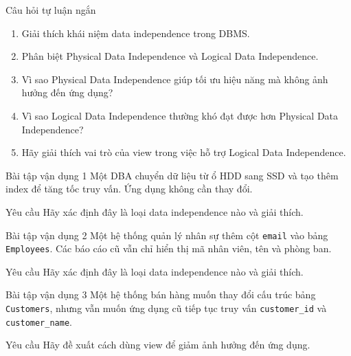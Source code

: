 \documentclass[aspectratio=169,11pt]{beamer}
\begin{document}
\begin{frame}{Câu hỏi tự luận ngắn}
\begin{enumerate}
  \item Giải thích khái niệm data independence trong DBMS.
  \item Phân biệt Physical Data Independence và Logical Data Independence.
  \item Vì sao Physical Data Independence giúp tối ưu hiệu năng mà không ảnh hưởng đến ứng dụng?
  \item Vì sao Logical Data Independence thường khó đạt được hơn Physical Data Independence?
  \item Hãy giải thích vai trò của view trong việc hỗ trợ Logical Data Independence.
\end{enumerate}
\end{frame}

\begin{frame}{Bài tập vận dụng 1}
Một DBA chuyển dữ liệu từ ổ HDD sang SSD và tạo thêm index để tăng tốc truy vấn. Ứng dụng không cần thay đổi.

\vspace{0.4cm}
\begin{block}{Yêu cầu}
Hãy xác định đây là loại data independence nào và giải thích.
\end{block}
\end{frame}

\begin{frame}{Bài tập vận dụng 2}
Một hệ thống quản lý nhân sự thêm cột \texttt{email} vào bảng \texttt{Employees}. Các báo cáo cũ vẫn chỉ hiển thị mã nhân viên, tên và phòng ban.

\vspace{0.4cm}
\begin{block}{Yêu cầu}
Hãy xác định đây là loại data independence nào và giải thích.
\end{block}
\end{frame}

\begin{frame}{Bài tập vận dụng 3}
Một hệ thống bán hàng muốn thay đổi cấu trúc bảng \texttt{Customers}, nhưng vẫn muốn ứng dụng cũ tiếp tục truy vấn \texttt{customer\_id} và \texttt{customer\_name}.

\vspace{0.4cm}
\begin{block}{Yêu cầu}
Hãy đề xuất cách dùng view để giảm ảnh hưởng đến ứng dụng.
\end{block}
\end{frame}
\end{document}

